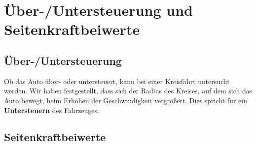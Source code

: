 \section{Über-/Untersteuerung und Seitenkraftbeiwerte}
\subsection{Über-/Untersteuerung}
Ob das Auto über- oder untersteuert, kann bei einer Kreisfahrt  untersucht werden. Wir haben festgestellt, dass sich der Radius des Kreises, auf dem sich das Auto bewegt, beim Erhöhen der Geschwindigkeit vergrößert. Dies spricht für ein \textbf{Untersteuern} des Fahrzeuges.

\subsection{Seitenkraftbeiwerte}

